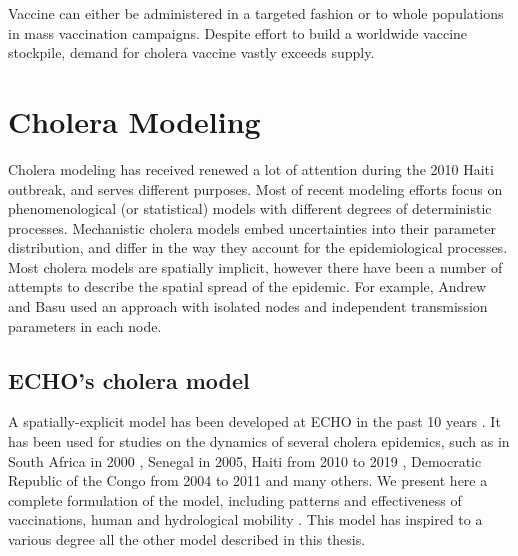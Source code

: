  Vaccine can either be administered in a targeted fashion or to whole populations in mass vaccination campaigns. Despite effort to build a worldwide vaccine stockpile, demand for cholera vaccine vastly exceeds supply\cite[-1\baselineskip]{Parker:AdaptingGlobalShortage:2017a,Seidlein:PreventingCholeraOutbreaks:2018}.


\section{Cholera Modeling}
Cholera modeling has received renewed a lot of attention during the 2010 Haiti outbreak, and serves different purposes. 
Most of recent modeling efforts focus on phenomenological (or statistical) models with different degrees of deterministic processes. Mechanistic cholera models embed uncertainties into their parameter distribution, and differ in the way they account for the epidemiological processes. Most cholera models are spatially implicit, however there have been a number of attempts to describe the spatial spread of the epidemic. For example, Andrew and Basu used an approach with isolated nodes and independent transmission parameters in each node.

\subsection{ECHO's cholera model}
A spatially-explicit model has been developed at ECHO in the past 10 years \parencite{Bertuzzo:SpacetimeEvolutionCholera:2008}. It has been used for studies on the dynamics of several cholera epidemics, such as in South Africa in 2000 \parencite{Mari:ModellingCholeraEpidemics:2012}, Senegal in 2005, Haiti from 2010 to 2019 \parencite{Bertuzzo:PredictionSpatialEvolution:2011,Bertuzzo:ProbabilityExtinctionHaiti:2016}, Democratic Republic of the Congo from 2004 to 2011 and many others\cite{Finger:PotentialImpactCasearea:2018}.  
We present here a complete formulation of the model, including patterns and effectiveness of vaccinations, human and hydrological mobility \parencite{Bertuzzo:ProbabilityExtinctionHaiti:2016,Pasetto:RealtimeForecastingCholera:2018}. This model has inspired to a various degree all the other model described in this thesis.


